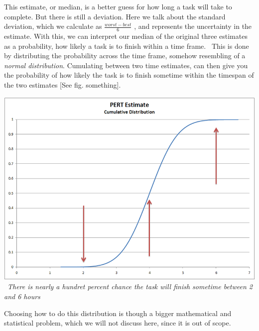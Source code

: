 This estimate, or median, is a better guess for how long a task will take to complete. But there is still a deviation. Here we talk about the standard deviation, which we calculate as 
$\frac{worst-best}{6}$
, and represents the uncertainty in the estimate. With this, we can interpret our median of the original three estimates as a probability, how likely a task is to finish within a time frame. \
This is done by distributing the probability across the time frame, somehow resembling of a \textit{normal distribution}. Cumulating between two time estimates, can then give you the probability of how likely the task is to finish sometime within the timespan of the two estimates [See fig. something]. \
\begin{center}
\includegraphics[scale=0.5]{PERTDistribution.png} 
\
\textit{There is nearly a hundret percent chance the task will finish sometime between 2 and 6 hours}
\end{center}

Choosing how to do this distribution is though a bigger mathematical and statistical problem, which we will not discuss here, since it is out of scope.

